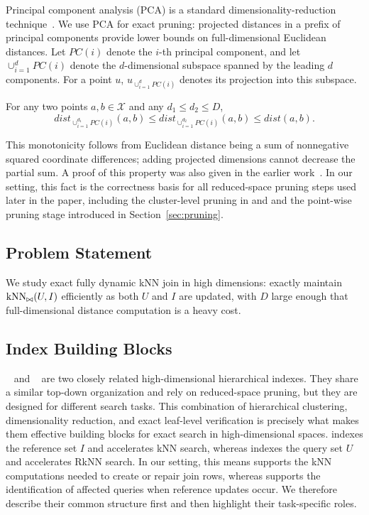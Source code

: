 Principal component analysis (PCA) is a standard dimensionality-reduction technique~\cite{wold1987principal,chakrabarti2000local,abdi2010principal,vidal2016principal}. We use PCA for exact pruning: projected distances in a prefix of principal components provide lower bounds on full-dimensional Euclidean distances. Let $PC(i)$ denote the $i$-th principal component, and let $\cup_{i=1}^{d}PC(i)$ denote the $d$-dimensional subspace spanned by the leading $d$ components. For a point $u$, $u_{\cup_{i=1}^{d}PC(i)}$ denotes its projection into this subspace.

\begin{lemma}\label{lm:pca_decrease_dist}\label{thm:distance_pca}
For any two points $a,b\in\mathcal{X}$ and any $d_1\le d_2\le D$,
\[
dist_{\cup_{i=1}^{d_1}PC(i)}(a,b)
\le
dist_{\cup_{i=1}^{d_2}PC(i)}(a,b)
\le
dist(a,b).
\]
\end{lemma}

This monotonicity follows from Euclidean distance being a sum of nonnegative squared coordinate differences; adding projected dimensions cannot decrease the partial sum. A proof of this property was also given in the earlier work~\cite{ukey2023efficient}. In our setting, this fact is the correctness basis for all reduced-space pruning steps used later in the paper, including the cluster-level pruning in \deltatree and \hdrtree and the point-wise pruning stage introduced in Section~\ref{sec:pruning}.

\subsection{Problem Statement}\label{sec:problem-statement}

We study exact fully dynamic kNN join in high dimensions: exactly maintain $\operatorname{kNN}_{\bowtie}(U,I)$ efficiently as both $U$ and $I$ are updated, with $D$ large enough that full-dimensional distance computation is a heavy cost.

\subsection{Index Building Blocks}\label{sec:index-building-blocks}

\deltatree~\cite{cui2003contorting} and \hdrtree~\cite{yang2014continuous} are two closely related high-dimensional hierarchical indexes. They share a similar top-down organization and rely on reduced-space pruning, but they are designed for different search tasks. This combination of hierarchical clustering, dimensionality reduction, and exact leaf-level verification is precisely what makes them effective building blocks for exact search in high-dimensional spaces. \deltatree indexes the reference set $I$ and accelerates kNN search, whereas \hdrtree indexes the query set $U$ and accelerates RkNN search. In our setting, this means \deltatree supports the kNN computations needed to create or repair join rows, whereas \hdrtree supports the identification of affected queries when reference updates occur. We therefore describe their common structure first and then highlight their task-specific roles.

